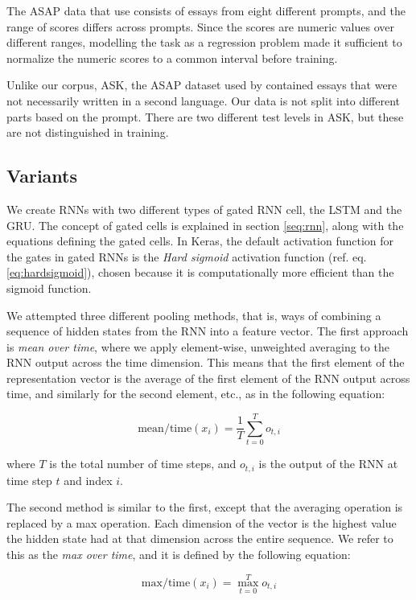 The ASAP data that \citeauthor{taghipour16} use consists of essays from eight
different prompts, and the range of scores differs across prompts. Since the
scores are numeric values over different ranges, modelling the task as a
regression problem made it sufficient to normalize the numeric scores to a
common interval before training.

Unlike our corpus, ASK, the ASAP dataset used by \citeauthor{taghipour16}
contained essays that were not necessarily written in a second language. Our
data is not split into different parts based on the prompt. There are two
different test levels in ASK, but these are not distinguished in training.


\subsection{Variants}

We create \acp{RNN} with two different types of gated \ac{RNN} cell, the
\ac{LSTM} and the \ac{GRU}. The concept of gated cells is explained in
section \ref{seq:rnn}, along with the equations defining the gated cells. In
Keras, the default activation function for the gates in gated RNNs is the
\emph{Hard sigmoid} activation function (ref. eq. \ref{eq:hardsigmoid}),
chosen because it is computationally more efficient than the sigmoid
function.

We attempted three different pooling methods, that is, ways of combining a
sequence of hidden states from the \ac{RNN} into a feature vector. The first
approach is \emph{mean over time}, where we apply element-wise, unweighted
averaging to the RNN output across the time dimension. This means that the
first element of the representation vector is the average of the first
element of the RNN output across time, and similarly for the second element,
etc., as in the following equation:

\[
  \mathrm{mean/time}(x_i) = \frac{1}{T}\sum_{t=0}^T o_{t,i}
\]

where $T$ is the total number of time steps, and $o_{t,i}$ is the output of
the RNN at time step $t$ and index $i$.

The second method is similar to the first, except that the averaging
operation is replaced by a max operation. Each dimension of the vector is the
highest value the hidden state had at that dimension across the entire
sequence. We refer to this as the \emph{max over time}, and it is defined by
the following equation:

\[
  \mathrm{max/time}(x_i) = \max_{t=0}^T o_{t,i}
\]

